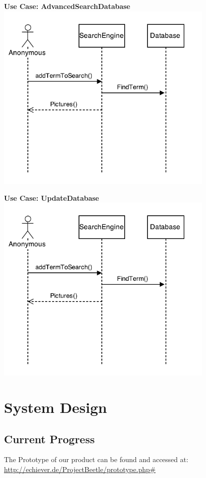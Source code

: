 \documentclass[12pt,a4paper]{article}
\begin{document}
{\bf Use Case: AdvancedSearchDatabase}\\

\includegraphics[height=92mm]{UseCase1.png}

{\bf Use Case: UpdateDatabase}\\

\includegraphics[height=92mm]{UseCase1.png}

\newpage

\section{System Design}
\subsection{Current Progress}

The Prototype of our product can be found and accessed at: \url{http://echiever.de/ProjectBeetle/prototype.php#}
\end{document}
